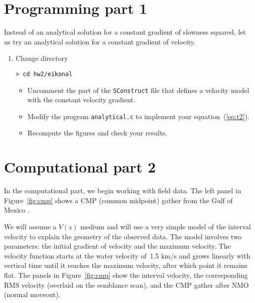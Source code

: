 \section{Programming part 1}

Instead of an analytical solution for a constant 
    gradient of slowness squared, let us try an analytical solution for a constant
    gradient of velocity.   

\begin{enumerate}
  \item Change directory
\begin{verbatim}
> cd hw2/eikonal
\end{verbatim}
    \begin{itemize}
    \item Uncomment the part of the
    \texttt{SConstruct} file that defines a velocity model with the
    constant velocity gradient. 
    \item Modify the program \texttt{analytical.c} to implement your equation~(\ref{eq:t2}).
    \item Recompute the figures and check your results.
    \end{itemize}
  \end{enumerate}       

\lstset{language=c,numbers=left,numberstyle=\tiny,showstringspaces=false}


\lstset{language=fortran,numbers=left,numberstyle=\tiny,showstringspaces=false}


\lstset{language=python,numbers=left,numberstyle=\tiny,showstringspaces=false}


\section{Computational part 2}

In the computational part, we begin working with field data. The left
panel in Figure~\ref{fig:cmp} shows a CMP (common midpoint) gather
from the Gulf of Mexico \cite[]{bei}.

 
We will assume a $V(z)$ medium and will use a very simple model of the
interval velocity to explain the geometry of the observed data. The
model involves two parameters: the initial gradient of velocity and
the maximum velocity. The velocity function starts at the water
velocity of~1.5 km/s and grows linearly with vertical time until it
reaches the maximum velocity, after which point it remains flat. The
panels in Figure~\ref{fig:cmp} show the interval velocity, the
corresponding RMS velocity (overlaid on the semblance scan), and the
CMP gather after NMO (normal moveout). 

